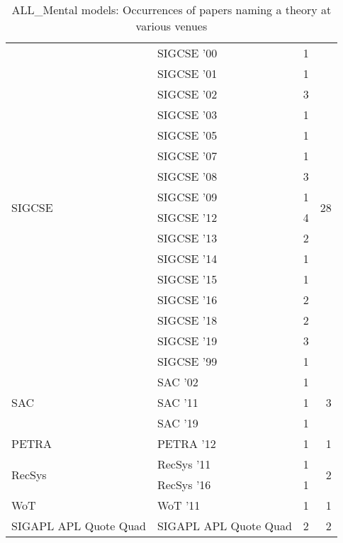 \begin{table*}[t]
\begin{tabular}{llrr}
\multirow{16}{*}{SIGCSE } & SIGCSE '00 & 1 & \multirow{16}{*}{28}\\
& SIGCSE '01 & 1 &\\
& SIGCSE '02 & 3 &\\
& SIGCSE '03 & 1 &\\
& SIGCSE '05 & 1 &\\
& SIGCSE '07 & 1 &\\
& SIGCSE '08 & 3 &\\
& SIGCSE '09 & 1 &\\
& SIGCSE '12 & 4 &\\
& SIGCSE '13 & 2 &\\
& SIGCSE '14 & 1 &\\
& SIGCSE '15 & 1 &\\
& SIGCSE '16 & 2 &\\
& SIGCSE '18 & 2 &\\
& SIGCSE '19 & 3 &\\
& SIGCSE '99 & 1 &\\
\multirow{3}{*}{SAC } & SAC '02 & 1 & \multirow{3}{*}{3}\\
& SAC '11 & 1 &\\
& SAC '19 & 1 &\\
\multirow{1}{*}{PETRA } & PETRA '12 & 1 & \multirow{1}{*}{1}\\
\multirow{2}{*}{RecSys } & RecSys '11 & 1 & \multirow{2}{*}{2}\\
& RecSys '16 & 1 &\\
\multirow{1}{*}{WoT } & WoT '11 & 1 & \multirow{1}{*}{1}\\
\multirow{1}{*}{SIGAPL APL Quote Quad} & SIGAPL APL Quote Quad & 2 & \multirow{1}{*}{2}\\
\end{tabular}
\caption{ALL\_Mental models: Occurrences of papers naming a theory at various venues}
\end{table*}